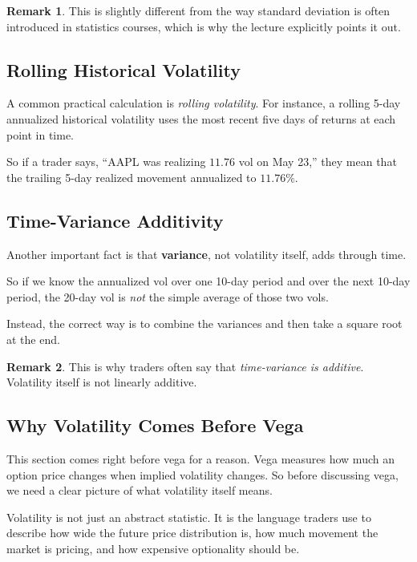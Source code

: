 \documentclass[11pt]{article}
\theoremstyle{definition}
\newtheorem{remark}{Remark}[section]
\begin{document}
\begin{remark}
This is slightly different from the way standard deviation is often introduced in statistics courses, which is why the lecture explicitly points it out.
\end{remark}

\subsection{Rolling Historical Volatility}

A common practical calculation is \emph{rolling volatility}. For instance, a rolling 5-day annualized historical volatility uses the most recent five days of returns at each point in time.

So if a trader says, “AAPL was realizing \(11.76\) vol on May 23,” they mean that the trailing 5-day realized movement annualized to \(11.76\%\).

\subsection{Time-Variance Additivity}

Another important fact is that \textbf{variance}, not volatility itself, adds through time.

So if we know the annualized vol over one 10-day period and over the next 10-day period, the 20-day vol is \emph{not} the simple average of those two vols.

Instead, the correct way is to combine the variances and then take a square root at the end.

\begin{remark}
This is why traders often say that \emph{time-variance is additive}. Volatility itself is not linearly additive.
\end{remark}

\subsection{Why Volatility Comes Before Vega}

This section comes right before vega for a reason. Vega measures how much an option price changes when implied volatility changes. So before discussing vega, we need a clear picture of what volatility itself means.

Volatility is not just an abstract statistic. It is the language traders use to describe how wide the future price distribution is, how much movement the market is pricing, and how expensive optionality should be.
\end{document}
